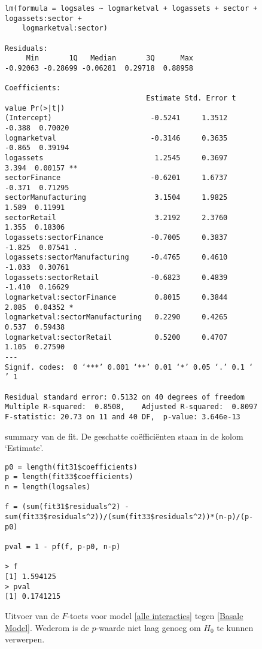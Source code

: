 \documentclass[a4paper]{report}
\begin{document}
  \begin{figure}[H]
  \begin{verbatim}
lm(formula = logsales ~ logmarketval + logassets + sector + logassets:sector + 
    logmarketval:sector)

Residuals:
     Min       1Q   Median       3Q      Max 
-0.92063 -0.28699 -0.06281  0.29718  0.88958 

Coefficients:
                                 Estimate Std. Error t value Pr(>|t|)   
(Intercept)                       -0.5241     1.3512  -0.388  0.70020   
logmarketval                      -0.3146     0.3635  -0.865  0.39194   
logassets                          1.2545     0.3697   3.394  0.00157 **
sectorFinance                     -0.6201     1.6737  -0.371  0.71295   
sectorManufacturing                3.1504     1.9825   1.589  0.11991   
sectorRetail                       3.2192     2.3760   1.355  0.18306   
logassets:sectorFinance           -0.7005     0.3837  -1.825  0.07541 . 
logassets:sectorManufacturing     -0.4765     0.4610  -1.033  0.30761   
logassets:sectorRetail            -0.6823     0.4839  -1.410  0.16629   
logmarketval:sectorFinance         0.8015     0.3844   2.085  0.04352 * 
logmarketval:sectorManufacturing   0.2290     0.4265   0.537  0.59438   
logmarketval:sectorRetail          0.5200     0.4707   1.105  0.27590   
---
Signif. codes:  0 ‘***’ 0.001 ‘**’ 0.01 ‘*’ 0.05 ‘.’ 0.1 ‘ ’ 1

Residual standard error: 0.5132 on 40 degrees of freedom
Multiple R-squared:  0.8508,	Adjusted R-squared:  0.8097 
F-statistic: 20.73 on 11 and 40 DF,  p-value: 3.646e-13
  \end{verbatim}
  \caption{summary van de fit. De geschatte co\"effici\"enten staan in de kolom `Estimate'.}
  \end{figure}
  
  \begin{figure}[H]
  \begin{verbatim}
p0 = length(fit31$coefficients)
p = length(fit33$coefficients)
n = length(logsales)

f = (sum(fit31$residuals^2) - sum(fit33$residuals^2))/(sum(fit33$residuals^2))*(n-p)/(p-p0)

pval = 1 - pf(f, p-p0, n-p)

> f
[1] 1.594125
> pval
[1] 0.1741215
  \end{verbatim}
  \caption{Uitvoer van de $F$-toets voor model \ref{alle interacties} tegen \ref{Basale Model}. Wederom is de $p$-waarde niet laag genoeg om $H_0$ te kunnen verwerpen.}
  \end{figure}
\end{document}
